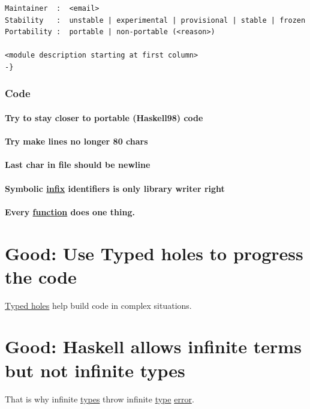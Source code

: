 \documentclass[a4paper,14pt,oneside]{book}
\begin{document}
{\begin{verbatim}
Maintainer  :  <email>
Stability   :  unstable | experimental | provisional | stable | frozen
Portability :  portable | non-portable (<reason>)

<module description starting at first column>
-}
\end{verbatim}

\subsection{Code}
\label{sec:org03544bf}

\subsubsection{Try to stay closer to portable (Haskell98) code}
\label{sec:org05bee5c}

\subsubsection{Try make lines no longer 80 chars}
\label{sec:org0346e63}

\subsubsection{Last char in file should be newline}
\label{sec:org33b9afe}

\subsubsection{Symbolic \hyperref[org4cb7988]{infix} identifiers is only library writer right}
\label{sec:org169c911}

\subsubsection{Every \hyperref[org6a60524]{function} does one thing.}
\label{sec:orge84fa6c}

\chapter{\label{orgfe9b65b}Good: Use Typed holes to progress the code}
\label{sec:org3bf62f4}
\hyperref[org28c8d61]{Typed holes} help build code in complex situations.\\

\chapter{\label{orgbd48f0e}Good: Haskell allows infinite terms but not infinite types}
\label{sec:orgf4809e1}
That is why infinite \hyperref[org51532d9]{types} throw infinite \hyperref[orga9ca243]{type} \hyperref[orgb40c72e]{error}.\\

}
\end{document}
